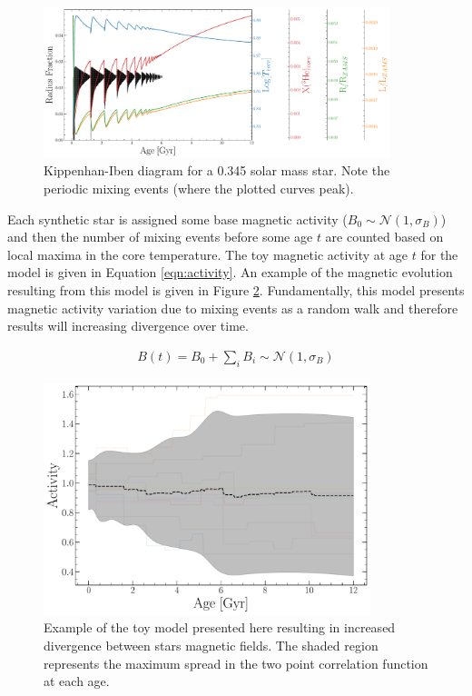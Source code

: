 \begin{figure}
  \centering
  \includegraphics[width=0.9\textwidth]{figures/jaoMagActivity/Kippenhan_clamped.pdf}
  \caption{Kippenhan-Iben diagram for a 0.345 solar mass star. Note the
  periodic mixing events (where the plotted curves peak).}
  \label{fig:kippenhan}
\end{figure}

Each synthetic star is assigned some base magnetic activity ($B_{0} \sim
\mathcal{N}(1, \sigma_{B})$) and then the number of mixing events before some age $t$
are counted based on local maxima in the core temperature. The toy magnetic
activity at age $t$ for the model is given in Equation \ref{eqn:activity}. An
example of the magnetic evolution resulting from this model is given in Figure
\ref{fig:simpleB}. Fundamentally, this model presents magnetic
activity variation due to mixing events as a random walk and therefore results will
increasing divergence over time.

\begin{align}\label{eqn:activity}
  B(t) = B_{0} + \sum_{i}B_{i} \sim \mathcal{N}(1, \sigma_{B}) 
\end{align}

\begin{figure}
  \centering
  \includegraphics[width=0.85\textwidth]{figures/jaoMagActivity/simpleBEvolution.pdf}
  \caption{Example of the toy model presented here resulting in increased
  divergence between stars magnetic fields. The shaded region represents the
  maximum spread in the two point correlation function at each age.}
  \label{fig:simpleB}
\end{figure}

